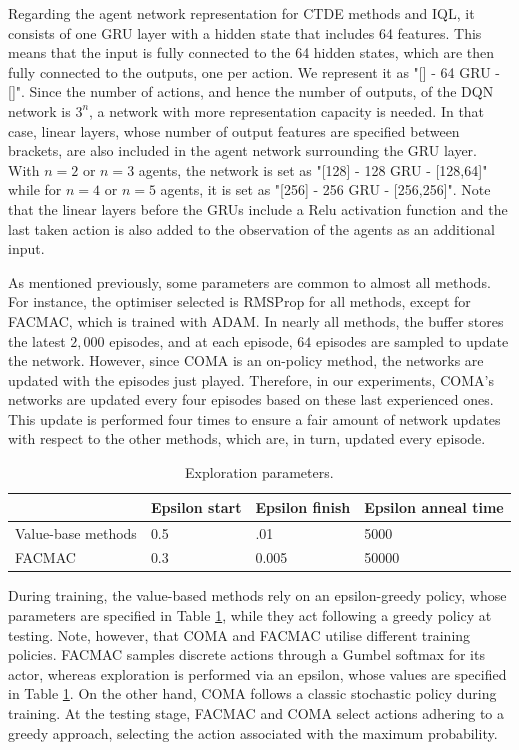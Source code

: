 Regarding the agent network representation for CTDE methods and IQL, it consists of one GRU layer with a hidden state that includes 64 features.
This means that the input is fully connected to the 64 hidden states, which are then fully connected to the outputs, one per action.
We represent it as "[] - 64 GRU - []".
Since the number of actions, and hence the number of outputs, of the DQN network is $3^n$, a network with more representation capacity is needed.
In that case, linear layers, whose number of output features are specified between brackets, are also included in the agent network surrounding the GRU layer.
With $n=2$ or $n=3$ agents, the network is set as "[128] - 128 GRU - [128,64]" while for $n=4$ or $n=5$ agents, it is set as "[256] - 256 GRU - [256,256]".
Note that the linear layers before the GRUs include a Relu activation function and the last taken action is also added to the observation of the agents as an additional input.

As mentioned previously, some parameters are common to almost all methods.
For instance, the optimiser selected is RMSProp for all methods, except for FACMAC, which is trained with ADAM.
In nearly all methods, the buffer stores the latest $2,000$ episodes, and at each episode, $64$ episodes are sampled to update the network.
However, since COMA is an on-policy method, the networks are updated with the episodes just played.
Therefore, in our experiments, COMA's networks are updated every four episodes based on these last experienced ones.
This update is performed four times to ensure a fair amount of network updates with respect to the other methods, which are, in turn, updated every episode.

\begin{table}
    \caption{Exploration parameters.}
    \centering
    \begin{tabular}{llll}
    \toprule
    & Epsilon start & Epsilon finish & Epsilon anneal time \\
    \midrule
    Value-base methods & 0.5  & .01 & 5000\\
    FACMAC & 0.3 & 0.005 & 50000 \\
    \bottomrule
    \end{tabular}
    \label{tab:exloration_param}
\end{table}

During training, the value-based methods rely on an epsilon-greedy policy, whose parameters are specified in Table \ref{tab:exloration_param}, while they act following a greedy policy at testing.
Note, however, that COMA and FACMAC utilise different training policies.
FACMAC samples discrete actions through a Gumbel softmax for its actor, whereas exploration is performed via an epsilon, whose values are specified in Table \ref{tab:exloration_param}.
On the other hand, COMA follows a classic stochastic policy during training.
At the testing stage, FACMAC and COMA select actions adhering to a greedy approach, selecting the action associated with the maximum probability.

